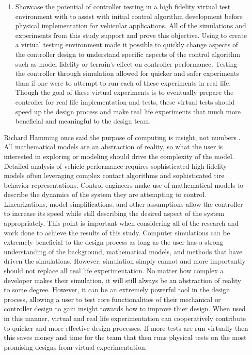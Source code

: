 \documentclass[12pt,onecolumn]{report}
\newcommand{\CHRONO}{{\sffamily{{Chrono}}}}
\begin{document}
\begin{enumerate}
\item
Showcase the potential of controller testing in a high fidelity virtual test environment with {\CHRONO} to assist with initial control algorithm development before physical implementation for vehicular applications. All of the simulations and experiments from this study support and prove this objective. Using {\CHRONO} to create a virtual testing environment made it possible to quickly change aspects of the controller design to understand specific aspects of the control algorithm such as model fidelity or terrain's effect on controller performance. Testing the controller through simulation allowed for quicker and safer experiments than if one were to attempt to run each of these experiments in real life. Though the goal of these virtual experiments is to eventually prepare the controller for real life implementation and tests, these virtual tests should speed up the design process and make real life experiments that much more beneficial and meaningful to the design team. 
\end{enumerate}

Richard Hamming once said the purpose of computing is insight, not numbers \cite{NumMethods}. All mathematical models are an abstraction of reality, so what the user is interested in exploring or modeling should drive the complexity of the model. Detailed analysis of vehicle performance requires sophisticated high fidelity models often leveraging complex contact algorithms and sophisticated tire behavior representations. Control engineers make use of mathematical models to describe the dynamics of the system they are attempting to control. Linearizations, model simplifications, and other assumptions allow the controller to increase its speed while still describing the desired aspect of the system appropriately. This point is important when considering all of the research and work done to achieve the results of this study. Computer simulations can be extremely beneficial to the design process as long as the user has a strong understanding of the background, mathematical models, and methods that have driven the simulations. However, simulation simply cannot and more importantly should not replace all real life experimentation. No matter how complex a developer makes their simulation, it will still always be an abstraction of reality to some degree. However, it can be an extremely powerful tool in the design process, allowing a user to test core functionalities of their mechanical or controller design to gain insight towards how to improve thier design. When used in this manner, virtual and real life experimentation can cooperatively contribute to quicker and more effective design processes. If more tests are run virtually then this saves money and time for the team that then runs physical tests on the most promising designs from virtual experimentation.  
\end{document}
